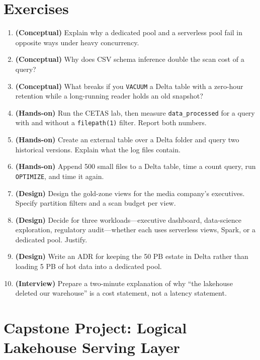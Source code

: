\section{Exercises}
\begin{enumerate}
    \item \textbf{(Conceptual)} Explain why a dedicated pool and a serverless pool fail in opposite ways under heavy concurrency.
    \item \textbf{(Conceptual)} Why does CSV schema inference double the scan cost of a query?
    \item \textbf{(Conceptual)} What breaks if you \texttt{VACUUM} a Delta table with a zero-hour retention while a long-running reader holds an old snapshot?
    \item \textbf{(Hands-on)} Run the CETAS lab, then measure \texttt{data\_processed} for a query with and without a \texttt{filepath(1)} filter. Report both numbers.
    \item \textbf{(Hands-on)} Create an external table over a Delta folder and query two historical versions. Explain what the log files contain.
    \item \textbf{(Hands-on)} Append 500 small files to a Delta table, time a count query, run \texttt{OPTIMIZE}, and time it again.
    \item \textbf{(Design)} Design the gold-zone views for the media company's executives. Specify partition filters and a scan budget per view.
    \item \textbf{(Design)} Decide for three workloads---executive dashboard, data-science exploration, regulatory audit---whether each uses serverless views, Spark, or a dedicated pool. Justify.
    \item \textbf{(Design)} Write an ADR for keeping the 50 PB estate in Delta rather than loading 5 PB of hot data into a dedicated pool.
    \item \textbf{(Interview)} Prepare a two-minute explanation of why ``the lakehouse deleted our warehouse'' is a cost statement, not a latency statement.
\end{enumerate}

\section{Capstone Project: Logical Lakehouse Serving Layer}\label{sec:ch7-capstone}

